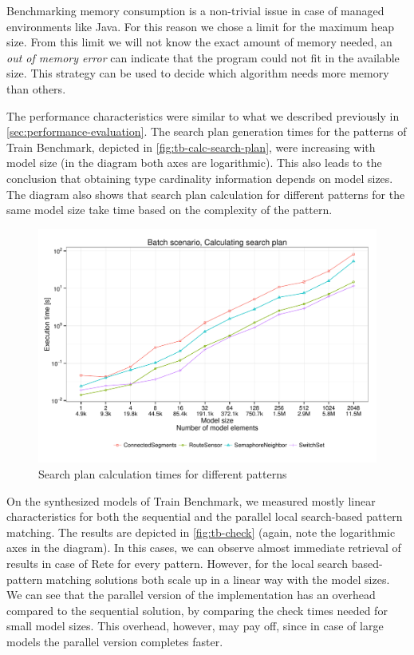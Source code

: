 Benchmarking memory consumption is a non-trivial issue in case of managed environments like Java. For this reason we chose a limit for the maximum heap size. From this limit we will not know the exact amount of memory needed, an \emph{out of memory error} can indicate that the program could not fit in the available size. This strategy can be used to decide which algorithm needs more memory than others.

The performance characteristics were similar to what we described previously in \autoref{sec:performance-evaluation}. The search plan generation times for the patterns of Train Benchmark, depicted in \autoref{fig:tb-calc-search-plan}, were increasing with model size (in the diagram both axes are logarithmic). This also leads to the conclusion that obtaining type cardinality information depends on model sizes. The diagram also shows that search plan calculation for different patterns for the same model size take time based on the complexity of the pattern.


\begin{figure}[htpb]
	\centering
	\includegraphics[width=\linewidth]{pdfs/Batch-Calculating-search-plan.pdf}
	
	\caption{Search plan calculation times for different patterns}
	\label{fig:tb-calc-search-plan}
\end{figure}

On the synthesized models of Train Benchmark, we measured mostly linear characteristics for both the sequential and the parallel local search-based pattern matching. The results are depicted in \autoref{fig:tb-check} (again, note the logarithmic axes in the diagram). In this cases, we can observe almost immediate retrieval of results in case of Rete for every pattern. However, for the local search based-pattern matching solutions both scale up in a linear way with the model sizes. We can see that the parallel version of the implementation has an overhead compared to the sequential solution, by comparing the check times needed for small model sizes. This overhead, however, may pay off, since in case of large models the parallel version completes faster.

